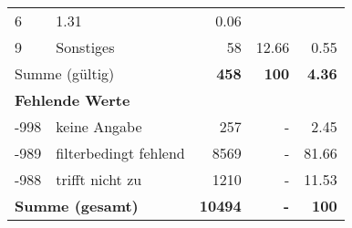 \begin{longtable}{lXrrr}
       \num{6} &
       \num[round-mode=places,round-precision=2]{1,31} &
         \num[round-mode=places,round-precision=2]{0,06} \\

     9 &
     \multicolumn{1}{X}{ Sonstiges   } &


       \num{58} &
       \num[round-mode=places,round-precision=2]{12,66} &
         \num[round-mode=places,round-precision=2]{0,55} \\
     \midrule
     \multicolumn{2}{l}{Summe (gültig)} &
       \textbf{\num{458}} &
     \textbf{100} &
       \textbf{\num[round-mode=places,round-precision=2]{4,36}} \\
     \multicolumn{5}{l}{\textbf{Fehlende Werte}}\\
       -998 &
       keine Angabe &
         \num{257} &
        - &
         \num[round-mode=places,round-precision=2]{2,45} \\
       -989 &
       filterbedingt fehlend &
         \num{8569} &
        - &
         \num[round-mode=places,round-precision=2]{81,66} \\
       -988 &
       trifft nicht zu &
         \num{1210} &
        - &
         \num[round-mode=places,round-precision=2]{11,53} \\
     \midrule
     \multicolumn{2}{l}{\textbf{Summe (gesamt)}} &
          \textbf{\num{10494}} &
        \textbf{-} &
        \textbf{100} \\
     \bottomrule
     \end{longtable}
     
